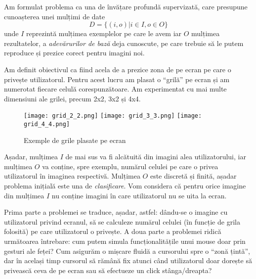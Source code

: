 Am formulat problema ca una de învățare profundă supervizată, care presupune cunoașterea unei mulțimi de date
$$D = \{(i, o) | i \in I, o \in O\}$$
unde $I$ reprezintă mulțimea exemplelor pe care le avem iar $O$ mulțimea rezultatelor, a \emph{adevărurilor de bază} deja cunoscute, pe care trebuie să le putem reproduce și prezice corect pentru imagini noi.

Am definit obiectivul ca fiind acela de a prezice zona de pe ecran pe care o privește utilizatorul.
Pentru acest lucru am plasat o ``grilă'' pe ecran și am numerotat fiecare celulă corespunzătoare.
Am experimentat cu mai multe dimensiuni ale grilei, precum 2x2, 3x2 și 4x4.

\begin{figure}[H]
    \centering
    \texttt{[image: grid\_2\_2.png]}
    \texttt{[image: grid\_3\_3.png]}
    \texttt{[image: grid\_4\_4.png]}
    \caption{Exemple de grile plasate pe ecran}
    \label{grid-example}
\end{figure}

Așadar, mulțimea $I$ de mai sus va fi alcătuită din imagini alea utilizatorului, iar mulțimea $O$ va conține, spre exemplu, numărul celulei pe care o privea utilizatorul în imaginea respectivă.
Mulțimea $O$ este discretă și finită, așadar problema inițială este una de \emph{clasificare}.
Vom considera că pentru orice imagine din mulțimea $I$ nu conține imagini în care utilizatorul nu se uita la ecran.

Prima parte a problemei se traduce, așadar, astfel: dându-se o imagine cu utilizatorul privind ecranul, să se calculeze numărul celulei (în funcție de grila folosită) pe care utilizatorul o privește.
A doua parte a problemei ridică următoarea întrebare: cum putem simula funcționalitățile unui mouse doar prin gesturi ale feței?
Cum asigurăm o mișcare fluidă a cursorului spre o ``zonă țintă'', dar în același timp cursorul să rămână fix atunci când utilizatorul doar dorește să privească ceva de pe ecran sau să efectueze un click stânga/dreapta?



